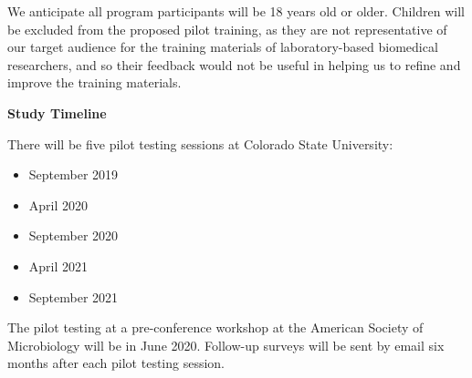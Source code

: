 \documentclass[pdftex,english,11.5pt,parskip=half]{scrartcl}
\begin{document}
We anticipate all program participants will be 18 years old or older. Children will be excluded from the proposed pilot training, as they are not representative of our target audience for the training materials of laboratory-based biomedical researchers, and so their feedback would not be useful in helping us to refine and 
improve the training materials. 

\clearpage

{\large \textbf{Study Timeline}}

There will be five pilot testing sessions at Colorado State University: 

\begin{itemize}
\item September 2019
\item April 2020
\item September 2020
\item April 2021
\item September 2021
\end{itemize}

The pilot testing at a pre-conference workshop at the American Society of Microbiology will be in June 2020. Follow-up surveys will be sent by email six months after each pilot testing session.
\end{document}
